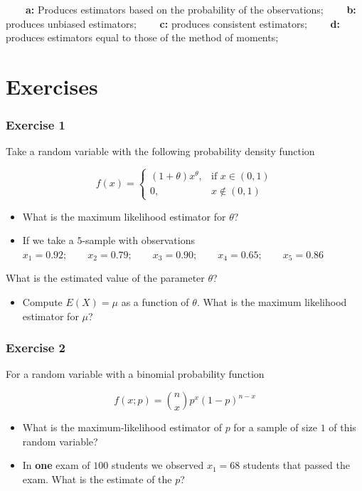 \documentclass[
]{book}
\providecommand{\tightlist}{%
  \setlength{\itemsep}{0pt}\setlength{\parskip}{0pt}}
\begin{document}
\textbf{\(\qquad\)a:} Produces estimators based on the probability of the observations;
\textbf{\(\qquad\)b:} produces unbiased estimators;
\textbf{\(\qquad\)c:} produces consistent estimators;
\textbf{\(\qquad\)d:} produces estimators equal to those of the method of moments;

\hypertarget{exercises-10}{%
\section{Exercises}\label{exercises-10}}

\hypertarget{exercise-1-9}{%
\subsubsection{Exercise 1}\label{exercise-1-9}}

Take a random variable with the following probability density function

\[
f(x)=
\begin{cases}
    (1+\theta)x^\theta,& \text{if } x\in (0,1)\\
    0,&  x\notin (0,1)
\end{cases}
\]

\begin{itemize}
\item
  What is the maximum likelihood estimator for \(\theta\)?
\item
  If we take a \(5\)-sample with observations
  \(x_1 = 0.92; \qquad x_2 = 0.79; \qquad x_3 = 0.90; \qquad x_4 = 0.65; \qquad x_5 = 0.86\)
\end{itemize}

What is the estimated value of the parameter \(\theta\)?

\begin{itemize}
\tightlist
\item
  Compute \(E(X)=\mu\) as a function of \(\theta\). What is the maximum likelihood estimator for \(\mu\)?
\end{itemize}

\hypertarget{exercise-2-9}{%
\subsubsection{Exercise 2}\label{exercise-2-9}}

For a random variable with a binomial probability function

\[f(x; p)=\binom n x p^x(1-p)^{n-x}\]

\begin{itemize}
\item
  What is the maximum-likelihood estimator of \(p\) for a sample of size \(1\) of this random variable?
\item
  In \textbf{one} exam of \(100\) students we observed \(x_1=68\) students that passed the exam. What is the estimate of the \(p\)?
\end{itemize}
\end{document}
